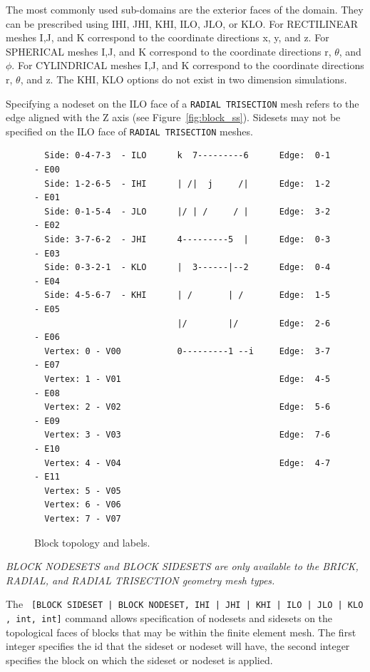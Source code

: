 The most commonly used sub-domains are the exterior faces of the
domain. They can be prescribed using \textsc {IHI, JHI, KHI, ILO,
JLO,} or \textsc {KLO}. For RECTILINEAR meshes \textsc {I,J,} and
\textsc {K} correspond to the coordinate directions x, y, and z. For
SPHERICAL meshes \textsc {I,J,} and \textsc {K} correspond to the
coordinate directions r, $\theta$, and $\phi$. For CYLINDRICAL meshes \textsc
{I,J,} and \textsc {K} correspond to the coordinate directions r,
$\theta$, and z.  The \textsc {KHI, KLO} options do not exist in two
dimension simulations.

Specifying a nodeset on the \textsc{ILO} face of a \texttt{RADIAL TRISECTION} mesh 
refers to the edge aligned with the Z axis (see Figure~\ref{fig:block_ss}). 
Sidesets may not be  specified on the \textsc{ILO} face of 
\texttt{RADIAL TRISECTION} meshes.

\begin{figure}[htbp]
{\ttfamily \small \begin{verbatim}
  Side: 0-4-7-3  - ILO      k  7---------6      Edge:  0-1 - E00  
  Side: 1-2-6-5  - IHI      | /|  j     /|      Edge:  1-2 - E01
  Side: 0-1-5-4  - JLO      |/ | /     / |      Edge:  3-2 - E02
  Side: 3-7-6-2  - JHI      4---------5  |      Edge:  0-3 - E03
  Side: 0-3-2-1  - KLO      |  3------|--2      Edge:  0-4 - E04
  Side: 4-5-6-7  - KHI      | /       | /       Edge:  1-5 - E05
                            |/        |/        Edge:  2-6 - E06
  Vertex: 0 - V00           0---------1 --i     Edge:  3-7 - E07
  Vertex: 1 - V01                               Edge:  4-5 - E08
  Vertex: 2 - V02                               Edge:  5-6 - E09
  Vertex: 3 - V03                               Edge:  7-6 - E10
  Vertex: 4 - V04                               Edge:  4-7 - E11
  Vertex: 5 - V05
  Vertex: 6 - V06
  Vertex: 7 - V07
\end{verbatim}
}
\caption{Block topology and labels.}
\label{fig:set_assign_topology}
\end{figure}

\emph{BLOCK NODESETS and BLOCK SIDESETS are only available to the BRICK,
RADIAL, and  RADIAL TRISECTION geometry mesh types.}

The \texttt{  [{BLOCK SIDESET | BLOCK NODESET},{ IHI | JHI | KHI | ILO | JLO |
KLO }, int, int]} command allows specification of nodesets and
sidesets on the topological faces of blocks that may be within the
finite element mesh. The first integer specifies the id that the
sideset or nodeset will have, the second integer specifies the block
on which the sideset or nodeset is applied.

